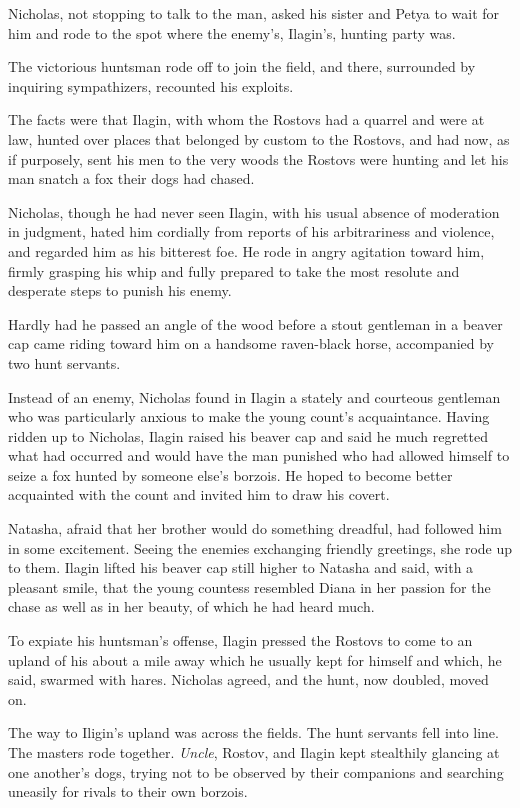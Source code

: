Nicholas, not stopping to talk to the man, asked his sister and
Petya to wait for him and rode to the spot where the enemy's,
Ilagin's, hunting party was.

The victorious huntsman rode off to join the field, and there,
surrounded by inquiring sympathizers, recounted his exploits.

The facts were that Ilagin, with whom the Rostovs had a quarrel
and were at law, hunted over places that belonged by custom to
the Rostovs, and had now, as if purposely, sent his men to the
very woods the Rostovs were hunting and let his man snatch a fox
their dogs had chased.

Nicholas, though he had never seen Ilagin, with his usual absence
of moderation in judgment, hated him cordially from reports of
his arbitrariness and violence, and regarded him as his bitterest
foe. He rode in angry agitation toward him, firmly grasping his
whip and fully prepared to take the most resolute and desperate
steps to punish his enemy.

Hardly had he passed an angle of the wood before a stout
gentleman in a beaver cap came riding toward him on a handsome
raven-black horse, accompanied by two hunt servants.

Instead of an enemy, Nicholas found in Ilagin a stately and
courteous gentleman who was particularly anxious to make the
young count's acquaintance. Having ridden up to Nicholas, Ilagin
raised his beaver cap and said he much regretted what had
occurred and would have the man punished who had allowed himself
to seize a fox hunted by someone else's borzois. He hoped to
become better acquainted with the count and invited him to draw
his covert.

Natasha, afraid that her brother would do something dreadful, had
followed him in some excitement. Seeing the enemies exchanging
friendly greetings, she rode up to them. Ilagin lifted his beaver
cap still higher to Natasha and said, with a pleasant smile, that
the young countess resembled Diana in her passion for the chase
as well as in her beauty, of which he had heard much.

To expiate his huntsman's offense, Ilagin pressed the Rostovs to
come to an upland of his about a mile away which he usually kept
for himself and which, he said, swarmed with hares. Nicholas
agreed, and the hunt, now doubled, moved on.

The way to Iligin's upland was across the fields. The hunt
servants fell into line. The masters rode together. \emph{Uncle},
Rostov, and Ilagin kept stealthily glancing at one another's
dogs, trying not to be observed by their companions and searching
uneasily for rivals to their own borzois.

